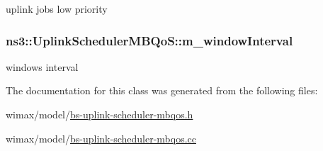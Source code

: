 uplink jobs low priority 

\subsubsection[{\texorpdfstring{m\+\_\+window\+Interval}{m_windowInterval}}]{ ns3\+::\+Uplink\+Scheduler\+M\+B\+Qo\+S\+::m\+\_\+window\+Interval\hspace{0.3cm}{\ttfamily [private]}}\hypertarget{classns3_1_1UplinkSchedulerMBQoS_aa3fb881e781d8cda4e7bb011c30d9f5d}{}\label{classns3_1_1UplinkSchedulerMBQoS_aa3fb881e781d8cda4e7bb011c30d9f5d}


windows interval 



The documentation for this class was generated from the following files\+:\begin{DoxyCompactItemize}
\item 
wimax/model/\hyperlink{bs-uplink-scheduler-mbqos_8h}{bs-\/uplink-\/scheduler-\/mbqos.\+h}\item 
wimax/model/\hyperlink{bs-uplink-scheduler-mbqos_8cc}{bs-\/uplink-\/scheduler-\/mbqos.\+cc}\end{DoxyCompactItemize}
